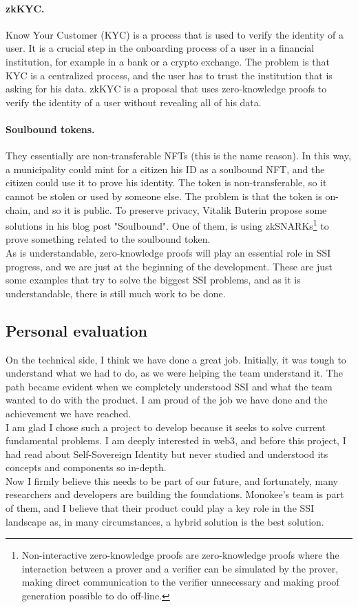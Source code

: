 \paragraph{zkKYC.} Know Your Customer (KYC) is a process that is used to verify the identity 
of a user. It is a crucial step in the onboarding process of a user in a financial 
institution, for example in a bank or a crypto exchange. The problem is that KYC is a 
centralized process, and the user has to trust the institution that is asking for his
data. zkKYC is a proposal that uses zero-knowledge proofs to verify the identity of a user
without revealing all of his data.

\paragraph{Soulbound tokens.} They essentially are non-transferable NFTs (this is the name 
reason). In this way, a municipality could mint for a citizen his ID as a soulbound NFT, 
and the citizen could use it to prove his identity. The token is non-transferable, so it 
cannot be stolen or used by someone else. The problem is that the token is on-chain, and 
so it is public. To preserve privacy, Vitalik Buterin propose some solutions in his blog 
post "Soulbound"\cite{article:soulbound}. One of them, is using zkSNARKs\footnote{Non-interactive 
zero-knowledge proofs are zero-knowledge proofs where the interaction between a prover 
and a verifier can be simulated by the prover, making direct communication to 
the verifier unnecessary and making proof generation possible to do off-line.} to prove 
something related to the soulbound token.
\vspace{0.3cm}\\
As is understandable, zero-knowledge proofs will play an essential role in SSI progress, 
and we are just at the beginning of the development. These are just some examples that try to solve the 
biggest SSI problems, and as it is understandable, there is still much work to be done.

\subsection{Personal evaluation}
On the technical side, I think we have done a great job. Initially, it was tough to 
understand what we had to do, as we were helping the team understand it. The path became 
evident when we completely understood SSI and what the team wanted to do with the product.
I am proud of the job we have done and the achievement we have reached.\\
I am glad I chose such a project to develop because it seeks to solve current fundamental
problems. I am deeply interested in web3\cite{site:web3wiki}, and before this project, I had read about 
Self-Sovereign Identity but never studied and understood its concepts and components so 
in-depth.\\
Now I firmly believe this needs to be part of our future, and fortunately, many researchers 
and developers are building the foundations. Monokee's team is part of them, and I believe 
that their product could play a key role in the SSI landscape as, in many circumstances, 
a hybrid solution is the best solution.\\